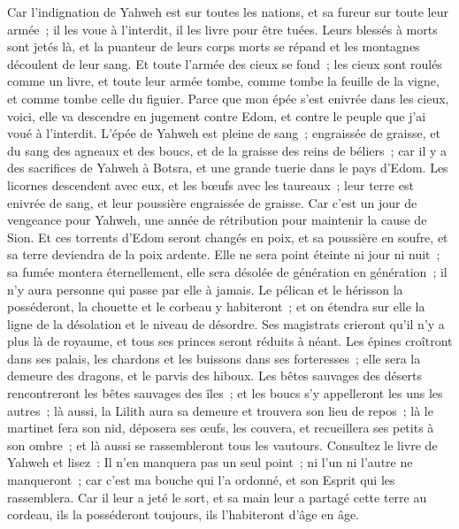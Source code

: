 \begin{multicols}{2}
Car l'indignation de Yahweh est sur toutes les nations, et sa fureur sur toute leur armée~; il les voue à l'interdit, il les livre pour être tuées.
Leurs blessés à morts sont jetés là, et la puanteur de leurs corps morts se répand et les montagnes découlent de leur sang.
Et toute l'armée des cieux se fond~; les cieux sont roulés comme un livre, et toute leur armée tombe, comme tombe la feuille de la vigne, et comme tombe celle du figuier.
Parce que mon épée s'est enivrée dans les cieux, voici, elle va descendre en jugement contre Edom, et contre le peuple que j'ai voué à l'interdit.
L'épée de Yahweh est pleine de sang~; engraissée de graisse, et du sang des agneaux et des boucs, et de la graisse des reins de béliers~; car il y a des sacrifices de Yahweh à Botsra, et une grande tuerie dans le pays d'Edom.
Les licornes descendent avec eux, et les bœufs avec les taureaux~; leur terre est enivrée de sang, et leur poussière engraissée de graisse.
Car c'est un jour de vengeance pour Yahweh, une année de rétribution pour maintenir la cause de Sion.
Et ces torrents d'Edom seront changés en poix, et sa poussière en soufre, et sa terre deviendra de la poix ardente.
Elle ne sera point éteinte ni jour ni nuit~; sa fumée montera éternellement, elle sera désolée de génération en génération~; il n'y aura personne qui passe par elle à jamais.
Le pélican et le hérisson la posséderont, la chouette et le corbeau y habiteront~; et on étendra sur elle la ligne de la désolation et le niveau de désordre.
Ses magistrats crieront qu'il n'y a plus là de royaume, et tous ses princes seront réduits à néant.
Les épines croîtront dans ses palais, les chardons et les buissons dans ses forteresses~; elle sera la demeure des dragons, et le parvis des hiboux.
Les bêtes sauvages des déserts rencontreront les bêtes sauvages des îles~; et les boucs s'y appelleront les uns les autres~; là aussi, la Lilith aura sa demeure et trouvera son lieu de repos~;
là le martinet fera son nid, déposera ses œufs, les couvera, et recueillera ses petits à son ombre~; et là aussi se rassembleront tous les vautours.
Consultez le livre de Yahweh et lisez~: Il n'en manquera pas un seul point~; ni l'un ni l'autre ne manqueront~; car c'est ma bouche qui l'a ordonné, et son Esprit qui les rassemblera.
Car il leur a jeté le sort, et sa main leur a partagé cette terre au cordeau, ils la posséderont toujours, ils l'habiteront d'âge en âge.

\end{multicols}
